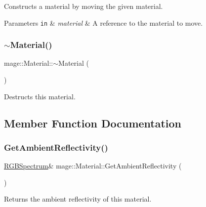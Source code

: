 Constructs a material by moving the given material.


\begin{DoxyParams}[1]{Parameters}
\mbox{\tt in}  & {\em material} & A reference to the material to move. \\
\hline
\end{DoxyParams}
\hypertarget{structmage_1_1_material_a4ca65b7e24144ee08dd1ce8d0eda9284}{}\label{structmage_1_1_material_a4ca65b7e24144ee08dd1ce8d0eda9284} 
\subsubsection{\texorpdfstring{$\sim$\+Material()}{~Material()}}
{\footnotesize\ttfamily mage\+::\+Material\+::$\sim$\+Material (\begin{DoxyParamCaption}{ }\end{DoxyParamCaption})\hspace{0.3cm}{\ttfamily [default]}}

Destructs this material. 

\subsection{Member Function Documentation}
\hypertarget{structmage_1_1_material_a244df193031de84daf6cb9b8c30f0d72}{}\label{structmage_1_1_material_a244df193031de84daf6cb9b8c30f0d72} 
\subsubsection{\texorpdfstring{Get\+Ambient\+Reflectivity()}{GetAmbientReflectivity()}\hspace{0.1cm}{\footnotesize\ttfamily [1/2]}}
{\footnotesize\ttfamily \hyperlink{structmage_1_1_r_g_b_spectrum}{R\+G\+B\+Spectrum}\& mage\+::\+Material\+::\+Get\+Ambient\+Reflectivity (\begin{DoxyParamCaption}{ }\end{DoxyParamCaption})\hspace{0.3cm}{\ttfamily [noexcept]}}

Returns the ambient reflectivity of this material.

